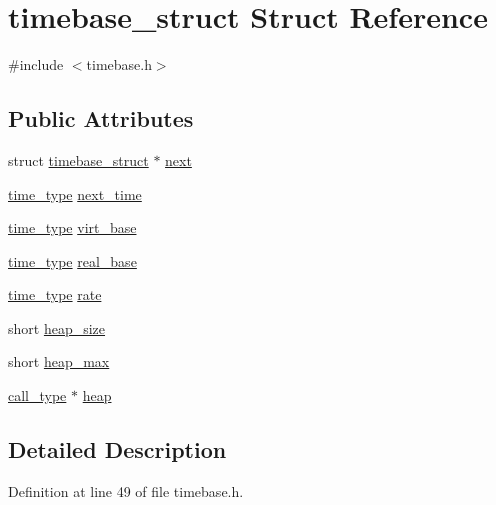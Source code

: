 \hypertarget{structtimebase__struct}{}\section{timebase\+\_\+struct Struct Reference}
\label{structtimebase__struct}


{\ttfamily \#include $<$timebase.\+h$>$}

\subsection*{Public Attributes}
\begin{DoxyCompactItemize}
\item 
struct \hyperlink{structtimebase__struct}{timebase\+\_\+struct} $\ast$ \hyperlink{structtimebase__struct_acc66c402d59aa01f42cfa2169ea2af16}{next}
\item 
\hyperlink{midifns_8h_a3f787491db5dbc75c21b27d54e9ebae6}{time\+\_\+type} \hyperlink{structtimebase__struct_a8fcec62ba28a693e4b2629d330eaf56e}{next\+\_\+time}
\item 
\hyperlink{midifns_8h_a3f787491db5dbc75c21b27d54e9ebae6}{time\+\_\+type} \hyperlink{structtimebase__struct_a35b158b60735ca665974f52b48b761f4}{virt\+\_\+base}
\item 
\hyperlink{midifns_8h_a3f787491db5dbc75c21b27d54e9ebae6}{time\+\_\+type} \hyperlink{structtimebase__struct_a5430817b264d9280c43a71c1f53fa31e}{real\+\_\+base}
\item 
\hyperlink{midifns_8h_a3f787491db5dbc75c21b27d54e9ebae6}{time\+\_\+type} \hyperlink{structtimebase__struct_a0b7fdc52e2a68a22aef8b948a207fd49}{rate}
\item 
short \hyperlink{structtimebase__struct_a5f145edb534454276ec7076d3d9ece31}{heap\+\_\+size}
\item 
short \hyperlink{structtimebase__struct_a7765b91dfd02b085a2a4f6699363ba0b}{heap\+\_\+max}
\item 
\hyperlink{timebase_8h_a665ac30c6ef78ffb4bda378f09befc2b}{call\+\_\+type} $\ast$ \hyperlink{structtimebase__struct_afce39c5827a70c2de6249ca2d473539f}{heap}
\end{DoxyCompactItemize}


\subsection{Detailed Description}


Definition at line 49 of file timebase.\+h.



